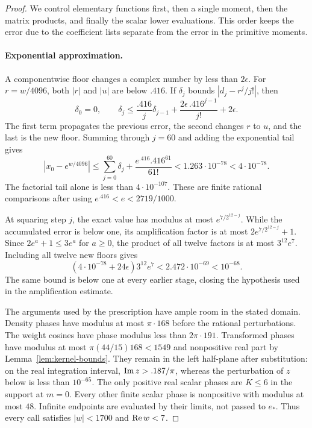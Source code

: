 \begin{proof}
We control elementary functions first, then a single moment, then the
matrix products, and finally the scalar lower evaluations.  This order
keeps the error due to the coefficient lists separate from the error in
the primitive moments.

\paragraph{Exponential approximation.}
A componentwise floor changes a complex number by less than $2\epsilon$.
For $r=w/4096$, both $|r|$ and $|u|$ are below $.416$.  If $\delta_j$
bounds $|d_j-r^j/j!|$, then
\[
 \delta_0=0,\qquad
 \delta_j\le\frac{.416}{j}\delta_{j-1}
 +\frac{2\epsilon\,.416^{j-1}}{j!}+2\epsilon.
\]
The first term propagates the previous error, the second changes $r$ to
$u$, and the last is the new floor.  Summing through $j=60$ and adding
the exponential tail gives
\[
 |x_0-e^{w/4096}|
 \le\sum_{j=0}^{60}\delta_j+\frac{e^{.416}.416^{61}}{61!}
 <1.263\cdot10^{-78}<4\cdot10^{-78}.
\]
The factorial tail alone is less than $4\cdot10^{-107}$.  These are finite
rational comparisons after using $e^{.416}<e<2719/1000$.

At squaring step $j$, the exact value has modulus at most
$e^{7/2^{12-j}}$.  While the accumulated error is below one, its
amplification factor is at most $2e^{7/2^{12-j}}+1$.
Since $2e^a+1\le3e^a$ for $a\ge0$, the product of all twelve factors
is at most $3^{12}e^7$.  Including all twelve new floors gives
\begin{equation}\label{eq:exponential-roundoff-budget}
 (4\cdot10^{-78}+24\epsilon)3^{12}e^7
 <2.472\cdot10^{-69}<10^{-68}.
\end{equation}
The same bound is below one at every earlier stage, closing the hypothesis
used in the amplification estimate.

The arguments used by the prescription have ample room in the stated domain.
Density phases have modulus at most $\pi\cdot168$ before the rational
perturbations.  The weight cosines have phase modulus less than
$2\pi\cdot191$.  Transformed phases have modulus at most
$\pi(44/15)168<1549$ and nonpositive real part by
Lemma~\ref{lem:kernel-bounds}.  They remain in the left half-plane after
substitution: on the real integration interval, $\operatorname{Im} z>.187/\pi$,
whereas the perturbation of $z$ below is less than $10^{-65}$.
The only positive real scalar phases are $K\le6$ in the support at $m=0$.
Every other finite scalar phase is nonpositive with modulus at most $48$.
Infinite endpoints are evaluated by their limits, not passed to $e_*$.
Thus every call satisfies $|w|<1700$ and $\operatorname{Re} w<7$.


\end{proof}
